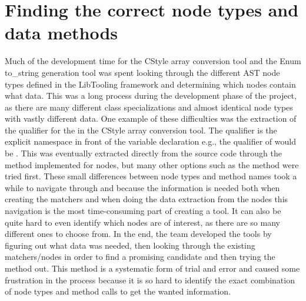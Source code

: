 
\section{Finding the correct node types and data methods}

Much of the development time for the CStyle array conversion tool and the Enum to\_string generation tool was spent looking through the different AST node types defined in the LibTooling framework and determining which nodes contain what data. This was a long process during the development phase of the project, as there are many different class specializations and almost identical node types with vastly different data. One example of these difficulties was the extraction of the qualifier for the  in the CStyle array conversion tool. The qualifier is the explicit namespace in front of the variable declaration e.g., the qualifier of  would be . This was eventually extracted directly from the source code through the   method implemented for  nodes, but many other options such as the  method were tried first. These small differences between node types and method names took a while to navigate through and because the information is needed both when creating the matchers and when doing the data extraction from the nodes this navigation is the most time-consuming part of creating a tool. It can also be quite hard to even identify which nodes are of interest, as there are so many different ones to choose from. In the end, the team developed the tools by figuring out what data was needed, then looking through the existing matchers/nodes in order to find a promising candidate and then trying the method out. This method is a systematic form of trial and error and caused some frustration in the process because it is so hard to identify the exact combination of node types and method calls to get the wanted information.